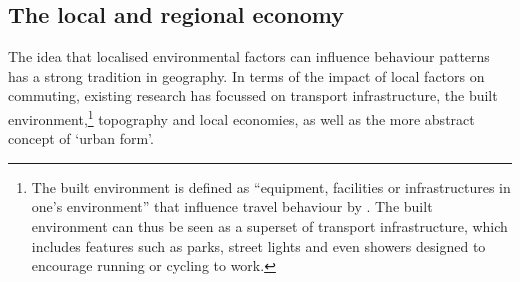 \subsection{The local and regional economy}
The idea that localised environmental factors can
influence behaviour patterns has a strong tradition
in geography.
In terms of the impact of local factors on commuting, existing
research has focussed on transport infrastructure, the built
environment,\footnote{The
built environment is defined as ``equipment, facilities or infrastructures in
one's environment'' that influence travel behaviour by \citet[p.~2]{Lemieux2009}.
The built environment can thus be seen as a superset of transport infrastructure,
which includes features such as parks, street lights and even showers designed
to encourage running or cycling to work.
}
topography and local economies, as well as the more abstract concept of
`urban form'.

